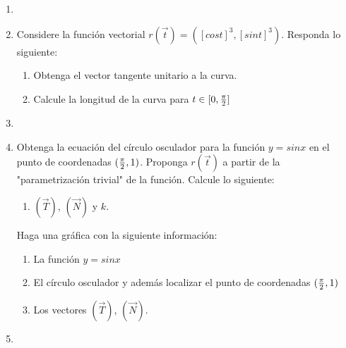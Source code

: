 \documentclass[10pt,letterpaper,fleqn]{article}
\begin{document}
\begin{enumerate}
        \item

        \item Considere la función vectorial $r(\overrightarrow{t})= ([cos t]^3,[sin t]^3)$. Responda lo siguiente:
        \begin{enumerate}
            \item Obtenga el vector tangente unitario a la curva.
            \item Calcule la longitud de la curva para $t \in [0,{\pi \over 2}]$
        \end{enumerate}

        \item

        \item Obtenga la ecuación del círculo osculador para la función $y=sin x$ en el punto de coordenadas $({\pi \over 2},1)$. Proponga $r(\overrightarrow{t})$ a partir de la "parametrización trivial" de la función. Calcule lo siguiente: 
        \begin{enumerate}
            \item $(\overrightarrow{T})$, $(\overrightarrow{N})$ y $k$.
        \end{enumerate}
        Haga una gráfica con la siguiente información:
        \begin{enumerate}
            \item La función $y=sin x$
            \item El círculo osculador y además localizar el punto de coordenadas $({\pi \over 2},1)$
            \item Los vectores $(\overrightarrow{T})$, $(\overrightarrow{N})$.
        \end{enumerate}

        \item 


    \end{enumerate}
\end{document}

